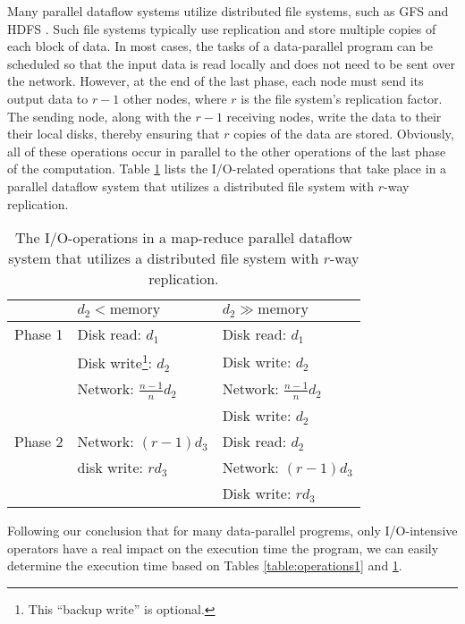 \documentclass{acm_proc_article-sp}
\begin{document}
Many parallel dataflow systems utilize distributed file systems, such as GFS \cite{gfs} and HDFS \cite{hdfs}. Such file systems typically use replication and store multiple copies of each block of data. In most cases, the tasks of a data-parallel program can be scheduled so that the input data is read locally and does not need to be sent over the network. However, at the end of the last phase, each node must send its output data to $r - 1$ other nodes, where $r$ is the file system's replication factor. The sending node, along with the $r - 1$ receiving nodes, write the data to their their local disks, thereby ensuring that $r$ copies of the data are stored. Obviously, all of these operations occur in parallel to the other operations of the last phase of the computation. Table \ref{table:operations2} lists the I/O-related operations that take place in a parallel dataflow system that utilizes a distributed file system with $r$-way replication.

\begin{table}
\centering
\begin{minipage}{0.5\textwidth}
\centering
\renewcommand{\arraystretch}{1.2}
\begin{tabular}{|l|l|l|}
\hline
        & $d_2 < \text{memory}$           & $d_2 \gg \text{memory}$ \\ \hline
Phase 1 & Disk read: $d_1$                & Disk read: $d_1$ \\ 
        & Disk write\footnote{This ``backup write'' is optional.}: $d_2$ & Disk write: $d_2$ \\
        & Network: $\frac{n-1}{n} d_2$    & Network: $\frac{n-1}{n} d_2$ \\
        &                                 & Disk write: $d_2$ \\ \hline
Phase 2 & Network: $\left(r-1\right) d_3$ & Disk read: $d_2$ \\
        & disk write: $r d_3$             & Network: $\left(r-1\right) d_3$ \\
        &                                 & Disk write: $r d_3$ \\
        \hline
\end{tabular}
\caption{The I/O-operations in a map-reduce parallel dataflow system that utilizes a distributed file system with $r$-way replication.}
\label{table:operations2}
\end{minipage}
\end{table}

Following our conclusion that for many data-parallel progrems, only
I/O-intensive operators have a real impact on the execution time the program,
we can easily determine the execution time based on Tables
\ref{table:operations1} and \ref{table:operations2}.
\end{document}
